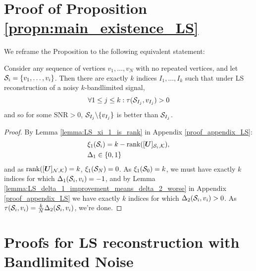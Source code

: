\section{Proof of Proposition \ref{propn:main_existence_LS}}
\label{app:LS_satisfied}
We reframe the Proposition to the following equivalent statement:

    Consider any sequence of vertices $v_{1},\dots, v_{N}$ with no repeated vertices, and let $\mathcal{S}_{i} = \{v_{1} , \dots , v_{i} \}$. Then there are exactly $k$ indices $I_{1}, \dots, I_{k}$ such that under LS reconstruction of a noisy $k$-bandlimited signal,
    \begin{equation}
        \forall 1\leq j \leq k: \tau(\mathcal{S}_{I_{j}}, v_{I_{j}}) > 0
    \end{equation}
    and so for some $\text{SNR}>0$, $\mathcal{S}_{I_{j}} \backslash \{v_{I_{j}}\}$ is better than $\mathcal{S}_{I_{j}}$.

\begin{proof}
\label{app:proof_main_existence_LS}
By Lemma \ref{lemma:LS_xi_1_is_rank} in Appendix \ref{proof_appendix_LS}: 
\begin{align}
    &\xi_{1}(\mathcal{S}_{i}) = k -\text{rank}([\bm{U}]_{\mathcal{S}_{i}, \mathcal{K}}), \\
    &\Delta_{1} \in \{0,1\}
\end{align}
 and as $\text{rank}(\matrsubU{N}) = k$, $\xi_{1}(\mathcal{S}_{N}) = 0$. As $\xi_{1}(\mathcal{S}_{0}) = k$, we must have exactly $k$ indices for which $\Delta_{1}(\mathcal{S}_{i}, v_{i}) = -1$, and by Lemma \ref{lemma:LS_delta_1_improvement_means_delta_2_worse} in Appendix \ref{proof_appendix_LS}  
  we have exactly $k$ indices for which $\Delta_{2}(\mathcal{S}_{i}, v_{i}) > 0$. As $\tau (\mathcal{S}_{i}, v_{i})= \frac{k}{N} \Delta_{2}(\mathcal{S}_{i}, v_{i})$, we're done.
\end{proof}

\section{Proofs for LS reconstruction with Bandlimited Noise}
\label{app:LS_Bandlimited_Noise_proofs}

